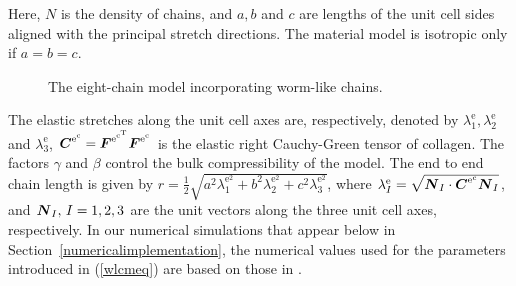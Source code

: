 Here, $N$ is
the density of chains, and $a,b$ and $c$ are lengths of the unit cell
sides aligned with the principal stretch directions. The material
model is isotropic only if $a=b=c$.

\begin{figure}
\caption{\small The eight-chain model incorporating worm-like
  chains.}\label{eightchain}
\end{figure}

The elastic stretches along the unit cell axes are, respectively,
denoted by
$\lambda_1^{\mathrm{e}},
\lambda_2^{\mathrm{e}}$ 
and 
$\lambda_3^{\mathrm{e}}$, $\mbox{\boldmath$ C$}^{\mathrm{e}^{\mathrm{c}}} =
\mbox{\boldmath$ F$}^{\mathrm{e}^{\mathrm{c}^{\mathrm{T}}}}
\mbox{\boldmath$ F$}^{\mathrm{e}^{\mathrm{c}}}$ is the elastic right Cauchy-Green
tensor of collagen. The factors $\gamma$ and $\beta$ control
the bulk compressibility of the model. The end to end chain length is
given by $r = \frac{1}{2}\sqrt{a^2\lambda_1^{\mathrm{e}^2} +
  b^2\lambda_2^{\mathrm{e}^2}+c^2\lambda_3^{\mathrm{e}^2}}$, where
$\lambda^\mathrm{e}_I = 
\sqrt{\mbox{\boldmath$ N$}_I\cdot\mbox{\boldmath$ C$}^{\mathrm{e}^{\mathrm{c}}}\mbox{\boldmath$ N$}_I}$, and $\mbox{\boldmath$ N$}_I,\,I =
1,2,3$ are the unit vectors along the three unit cell axes,
respectively. In our numerical simulations that appear below in
Section~\ref{numericalimplementation}, the numerical values used for
the parameters introduced in (\ref{wlcmeq}) are based on those in
\citet{kuhlremod05}.


